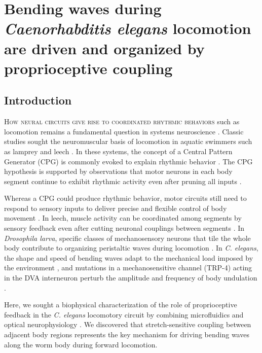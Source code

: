 
\chapter{Bending waves during \textit{Caenorhabditis elegans} locomotion are driven and organized by proprioceptive coupling }\label{chapter:proprioceptive}


\section{Introduction}
\lettrine{H}{ow neural circuits give rise to coordinated rhythmic behaviors} such as locomotion remains a fundamental question in systems neuroscience 
\citep{delcomyn_neural_1980}. Classic studies sought the neuromuscular 
basis of locomotion in aquatic swimmers such as lamprey and leech \citep{marder_principles_1996,kristan_rhythmic_1976,cohen_neuronal_1980,friesen_neuronal_1978,ermentrout_frequency_1984}. In these systems, the concept of a Central Pattern Generator (CPG) is commonly evoked to explain rhythmic behavior \citep{delcomyn_neural_1980,marder_principles_1996}. The CPG hypothesis is supported by observations that motor neurons in each body segment continue to exhibit rhythmic activity even after pruning all inputs \citep{kristan_rhythmic_1976,cohen_neuronal_1980,pearce_intersegmental_1984}.




Whereas a CPG could produce rhythmic behavior, motor circuits still need to respond to sensory 
inputs to deliver precise and flexible control of body movement \citep{delcomyn_neural_1980}. In leech, muscle activity can be coordinated among segments by sensory feedback even after cutting neuronal couplings between segments \citep{yu_sensory_1999}. In \textit{Drosophila larva}, specific classes of mechanosensory neurons that tile the whole body contribute to organizing peristaltic waves during locomotion \citep{hughes_sensory_2007,song_peripheral_2007,cheng_role_2010}. In \textit{C. 
elegans}, the shape and speed of bending waves adapt to the mechanical load imposed by the 
environment \citep{fang-yen_biomechanical_2010,berri_forward_2009}, and mutations in a mechanosensitive channel (TRP-4) acting in the DVA 
interneuron perturb the amplitude and frequency of body undulation \citep{li_c._2006}.


Here, we sought a biophysical characterization of the role of proprioceptive feedback in the \textit{C. elegans} locomotory circuit by combining microfluidics and optical neurophysiology \citep{liewald_optogenetic_2008,chronis_microfluidics_2007,zhang_multimodal_2007,clark_temporal_2007,lockery_artificial_2008}. We discovered that stretch-sensitive coupling between adjacent body regions represents the key mechanism for driving bending waves along the worm body during forward locomotion.






